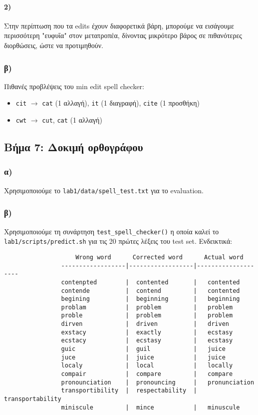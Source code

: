 \documentclass[a4paper, 12pt]{article}
\begin{document}
            \paragraph{2)}
            	Στην περίπτωση που τα edits έχουν διαφορετικά βάρη, μπορούμε να εισάγουμε περισσότερη "ευφυΐα" στον μετατροπέα, δίνοντας μικρότερο βάρος σε πιθανότερες διορθώσεις, ώστε να προτιμηθούν. 
            	
        \subsubsection*{β)}
    		Πιθανές προβλέψεις του min edit spell checker:
    		
    		\begin{itemize}
    			\item \verb|cit| $\rightarrow$ \verb|cat| (1 αλλαγή), \verb|it| (1 διαγραφή), \verb|cite| (1 προσθήκη)
    			\item \verb|cwt| $\rightarrow$ \verb|cut|, \verb|cat| (1 αλλαγή)
    		\end{itemize}
    		
    \subsection*{Βήμα 7: Δοκιμή ορθογράφου}
        \subsubsection*{α)}
        	Χρησιμοποιούμε το \verb|lab1/data/spell_test.txt| για το evaluation.
        \subsubsection*{β)}
        	Χρησιμοποιούμε τη συνάρτηση \verb|test_spell_checker()| η οποία καλεί το \verb|lab1/scripts/predict.sh| για τις 20 πρώτες λέξεις του test set. Ενδεικτικά:
        	
        	\begin{verbatim}
        	    	Wrong word      Corrected word      Actual word
        		------------------|------------------|--------------------
        		contenpted        |  contented       |   contented
        		contende          |  contend         |   contented
        		begining          |  beginning       |   beginning
        		problam           |  problem         |   problem
        		proble            |  problem         |   problem
        		dirven            |  driven          |   driven
        		exstacy           |  exactly         |   ecstasy
        		ecstacy           |  ecstasy         |   ecstasy
        		guic              |  guil            |   juice
        		juce              |  juice           |   juice
        		localy            |  local           |   locally
        		compair           |  compare         |   compare
        		pronounciation    |  pronouncing     |   pronunciation
        		transportibility  |  respectability  |   transportability
        		miniscule         |  mince           |   minuscule
        	\end{verbatim}
        	
\end{document}
